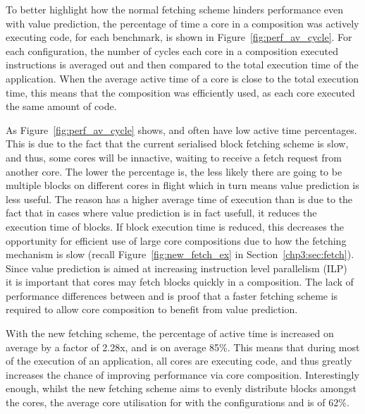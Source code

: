 To better highlight how the normal fetching scheme hinders performance even with value prediction, the percentage of time a core in a composition was actively executing code, for each benchmark, is shown in Figure~\ref{fig:perf_av_cycle}.
For each configuration, the number of cycles each core in a composition executed instructions is averaged out and then compared to the total execution time of the application.
When the average active time of a core is close to the total execution time, this means that the composition was efficiently used, as each core executed the same amount of code.

As Figure~\ref{fig:perf_av_cycle} shows, \novp{} and \vp{} often have low active time percentages.
This is due to the fact that the current serialised block fetching scheme is slow, and thus, some cores will be innactive, waiting to receive a fetch request from another core.
The lower the percentage is, the less likely there are going to be multiple blocks on different cores in flight which in turn means value prediction is less useful.
The reason \novp{} has a higher average time of execution than \vp{} is due to the fact that in cases where value prediction is in fact usefull, it reduces the execution time of blocks.
If block execution time is reduced, this decreases the opportunity for efficient use of large core compositions due to how the fetching mechanism is slow (recall Figure~\ref{fig:new_fetch_ex} in Section~\ref{chp3:sec:fetch}).
Since value prediction is aimed at increasing instruction level parallelism (ILP)~\cite{peraisBeBop2015} it is important that cores may fetch blocks quickly in a composition.
The lack of performance differences between \novp{} and \vp{} is proof that a faster fetching scheme is required to allow core composition to benefit from value prediction.

With the new fetching scheme, the percentage of active time is increased on average by a factor of 2.28x, and is on average 85\%.
This means that during most of the execution of an application, all cores are executing code, and thus greatly increases the chance of improving performance via core composition.
Interestingly enough, whilst the new fetching scheme aims to evenly distribute blocks amongst the cores, the average core utilisation for  with the configurations \nfnovp{} and \nfvp{} is of 62\%.

